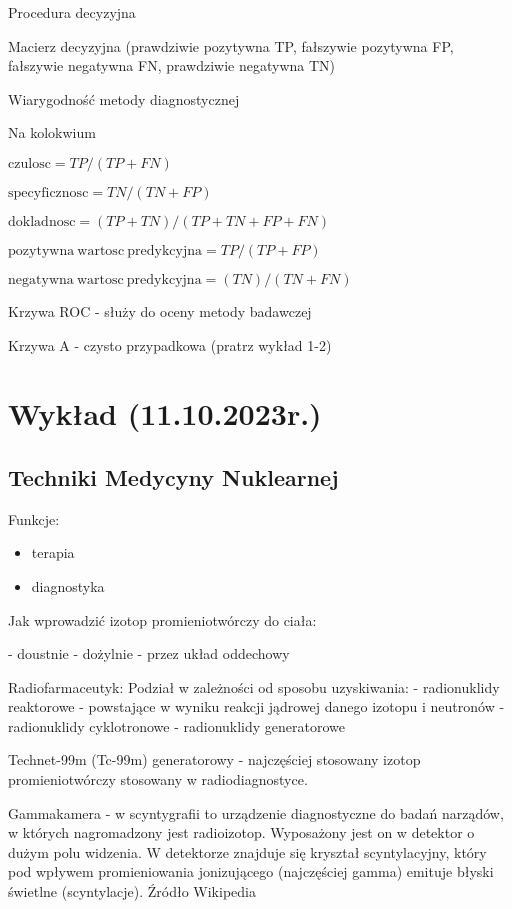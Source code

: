 \documentclass{article}
\begin{document}
Procedura decyzyjna

Macierz decyzyjna (prawdziwie pozytywna TP, fałszywie pozytywna FP, fałszywie negatywna FN, prawdziwie negatywna TN)

Wiarygodność metody diagnostycznej

Na kolokwium

$\mathrm{czulosc} = TP/(TP+FN)$

$\mathrm{specyficznosc} = TN/(TN+FP)$

$\mathrm{dokladnosc} = (TP + TN)/(TP + TN + FP + FN)$

$\mathrm{pozytywna~wartosc~predykcyjna} = TP/(TP + FP)$

$\mathrm{negatywna~wartosc~predykcyjna} = (TN)/(TN + FN)$

Krzywa ROC - służy do oceny metody badawczej

Krzywa A - czysto przypadkowa (pratrz wykład 1-2)

\section{Wykład (11.10.2023r.)}

\subsection{Techniki Medycyny Nuklearnej}

Funkcje:
\begin{itemize}
    \item terapia
    \item diagnostyka
\end{itemize}

Jak wprowadzić izotop promieniotwórczy do ciała:

- doustnie
- dożylnie
- przez układ oddechowy

Radiofarmaceutyk:
Podział w zależności od sposobu uzyskiwania:
- radionuklidy reaktorowe - powstające w wyniku reakcji jądrowej danego izotopu i neutronów
- radionuklidy cyklotronowe 
- radionuklidy generatorowe

Technet-99m (Tc-99m) generatorowy - najczęściej stosowany izotop promieniotwórczy stosowany w radiodiagnostyce.

Gammakamera - w scyntygrafii to urządzenie diagnostyczne do badań narządów, w których nagromadzony jest radioizotop. Wyposażony jest on w detektor o dużym polu widzenia. W detektorze znajduje się kryształ scyntylacyjny, który pod wpływem promieniowania jonizującego (najczęściej gamma) emituje błyski świetlne (scyntylacje). Źródło Wikipedia
\end{document}
